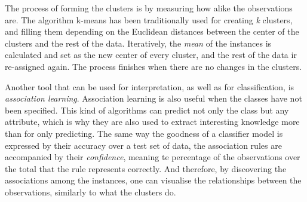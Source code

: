 The process of forming the clusters is by measuring how alike the observations are. The algorithm k-means \cite{hartigan1975clustering} has been traditionally used for creating \textit{k} clusters, and filling them depending on the Euclidean distances between the center of the clusters and the rest of the data. Iteratively, the \textit{mean} of the instances is calculated and set as the new center of every cluster, and the rest of the data ir re-assigned again. The process finishes when there are no changes in the clusters.

Another tool that can be used for interpretation, as well as for classification, is \textit{association learning}. Association learning is also useful when the classes have not been specified. This kind of algorithms \cite{hipp2000algorithms} can predict not only the class but any attribute, which is why they are also used to extract interesting knowledge more than for only predicting. The same way the goodness of a classifier model is expressed by their accuracy over a test set of data, the association rules are accompanied by their \textit{confidence}, meaning te percentage of the observations over the total that the rule represents correctly. And therefore, by discovering the associations among the instances, one can visualise the relationships between the observations, similarly to what the clusters do.